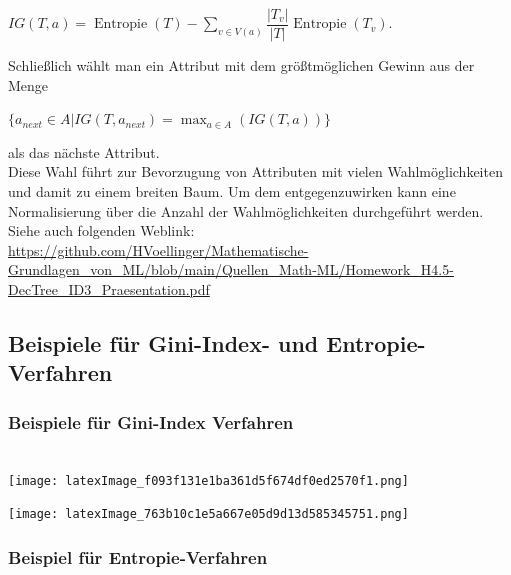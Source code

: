 \documentclass[12pt]{article}
\begin{document}
\begin{center}
$ IG(T, a) = \operatorname{Entropie}(T) - \sum_{v \in V(a)} \dfrac{|T_v|}{|T|} \operatorname{Entropie} (T_v) $. \\
\end{center}
Schließlich wählt man ein Attribut mit dem größtmöglichen Gewinn aus der Menge 
\begin{center} 
$\lbrace a_{next} \in A | IG(T, a_{next}) = \max_{a \in A}(IG(T, a)) \rbrace $ 
\end{center}
als das nächste Attribut.\\[0.2cm]
Diese Wahl führt zur Bevorzugung von Attributen mit vielen Wahlmöglichkeiten und damit zu einem breiten Baum. Um dem entgegenzuwirken kann eine Normalisierung über die Anzahl der Wahlmöglichkeiten durchgeführt werden.\\
Siehe auch folgenden Weblink:\\
\url{https://github.com/HVoellinger/Mathematische-Grundlagen_von_ML/blob/main/Quellen_Math-ML/Homework_H4.5-DecTree_ID3_Praesentation.pdf}\\[0.2cm]


\subsection{Beispiele für Gini-Index- und Entropie-Verfahren }


\subsubsection{Beispiele für Gini-Index Verfahren}

{\color{red}{***********************************************************************\\ 
Ab hier bis Ende der Section sind die Folien der Vorlesung ML  zu nutzen und diese sind in Latex umzusetzen...\\
************************************************************************}}\\[0.2cm]



\hspace*{-1.8cm}
\texttt{[image: latexImage\_f093f131e1ba361d5f674df0ed2570f1.png]}

\hspace*{-1.8cm}
\texttt{[image: latexImage\_763b10c1e5a667e05d9d13d585345751.png]}

\subsubsection{Beispiel für Entropie-Verfahren}
\end{document}
